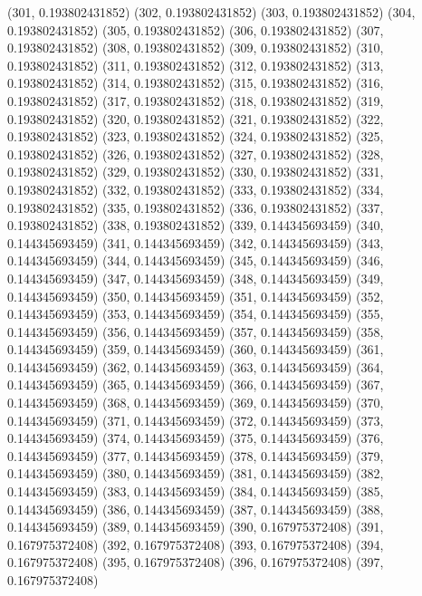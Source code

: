 {					(301, 0.193802431852)
					(302, 0.193802431852)
					(303, 0.193802431852)
					(304, 0.193802431852)
					(305, 0.193802431852)
					(306, 0.193802431852)
					(307, 0.193802431852)
					(308, 0.193802431852)
					(309, 0.193802431852)
					(310, 0.193802431852)
					(311, 0.193802431852)
					(312, 0.193802431852)
					(313, 0.193802431852)
					(314, 0.193802431852)
					(315, 0.193802431852)
					(316, 0.193802431852)
					(317, 0.193802431852)
					(318, 0.193802431852)
					(319, 0.193802431852)
					(320, 0.193802431852)
					(321, 0.193802431852)
					(322, 0.193802431852)
					(323, 0.193802431852)
					(324, 0.193802431852)
					(325, 0.193802431852)
					(326, 0.193802431852)
					(327, 0.193802431852)
					(328, 0.193802431852)
					(329, 0.193802431852)
					(330, 0.193802431852)
					(331, 0.193802431852)
					(332, 0.193802431852)
					(333, 0.193802431852)
					(334, 0.193802431852)
					(335, 0.193802431852)
					(336, 0.193802431852)
					(337, 0.193802431852)
					(338, 0.193802431852)
					(339, 0.144345693459)
					(340, 0.144345693459)
					(341, 0.144345693459)
					(342, 0.144345693459)
					(343, 0.144345693459)
					(344, 0.144345693459)
					(345, 0.144345693459)
					(346, 0.144345693459)
					(347, 0.144345693459)
					(348, 0.144345693459)
					(349, 0.144345693459)
					(350, 0.144345693459)
					(351, 0.144345693459)
					(352, 0.144345693459)
					(353, 0.144345693459)
					(354, 0.144345693459)
					(355, 0.144345693459)
					(356, 0.144345693459)
					(357, 0.144345693459)
					(358, 0.144345693459)
					(359, 0.144345693459)
					(360, 0.144345693459)
					(361, 0.144345693459)
					(362, 0.144345693459)
					(363, 0.144345693459)
					(364, 0.144345693459)
					(365, 0.144345693459)
					(366, 0.144345693459)
					(367, 0.144345693459)
					(368, 0.144345693459)
					(369, 0.144345693459)
					(370, 0.144345693459)
					(371, 0.144345693459)
					(372, 0.144345693459)
					(373, 0.144345693459)
					(374, 0.144345693459)
					(375, 0.144345693459)
					(376, 0.144345693459)
					(377, 0.144345693459)
					(378, 0.144345693459)
					(379, 0.144345693459)
					(380, 0.144345693459)
					(381, 0.144345693459)
					(382, 0.144345693459)
					(383, 0.144345693459)
					(384, 0.144345693459)
					(385, 0.144345693459)
					(386, 0.144345693459)
					(387, 0.144345693459)
					(388, 0.144345693459)
					(389, 0.144345693459)
					(390, 0.167975372408)
					(391, 0.167975372408)
					(392, 0.167975372408)
					(393, 0.167975372408)
					(394, 0.167975372408)
					(395, 0.167975372408)
					(396, 0.167975372408)
					(397, 0.167975372408)
}
